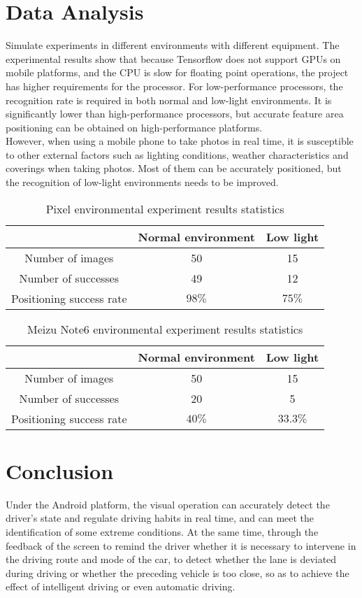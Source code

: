 \documentclass[12pt, a4paper]{article}
\begin{document}
\section*{Data Analysis}
Simulate experiments in different environments with different equipment. The experimental results show that because Tensorflow does not support GPUs on mobile platforms, and the CPU is slow for floating point operations, the project has higher requirements for the processor. For low-performance processors, the recognition rate is required in both normal and low-light environments. It is significantly lower than high-performance processors, but accurate feature area positioning can be obtained on high-performance platforms.
\\However, when using a mobile phone to take photos in real time, it is susceptible to other external factors such as lighting conditions, weather characteristics and coverings when taking photos. Most of them can be accurately positioned, but the recognition of low-light environments needs to be improved.

\begin{table}[h!]
  \centering
  \caption{Pixel environmental experiment results statistics}
  \label{tab:table1}
  \begin{tabular}{ccc}
    \toprule
        & Normal environment & Low light\\
    \midrule
    Number of images & 50 & 15\\
    Number of successes & 49 & 12\\
    Positioning success rate & $98\%$ & $75\%$\\
    \bottomrule
  \end{tabular}
\end{table}

\begin{table}[h!]
  \centering
  \caption{Meizu Note6 environmental experiment results statistics}
  \label{tab:table1}
  \begin{tabular}{ccc}
    \toprule
        & Normal environment & Low light\\
    \midrule
    Number of images & 50 & 15\\
    Number of successes & 20 & 5\\
    Positioning success rate & $40\%$ & $33.3\%$\\
    \bottomrule
  \end{tabular}
\end{table}

\section*{Conclusion}
Under the Android platform, the visual operation can accurately detect the driver's state and regulate driving habits in real time, and can meet the identification of some extreme conditions. At the same time, through the feedback of the screen to remind the driver whether it is necessary to intervene in the driving route and mode of the car, to detect whether the lane is deviated during driving or whether the preceding vehicle is too close, so as to achieve the effect of intelligent driving or even automatic driving.
\end{document}
